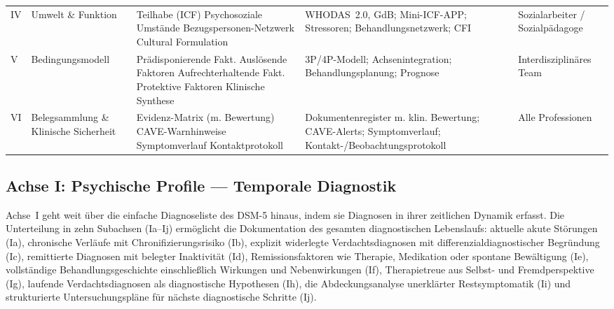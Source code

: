 \documentclass[11pt,a4paper]{article}
\begin{document}
\begin{longtable}{p{0.8cm}p{2.2cm}p{3.8cm}p{4cm}p{2cm}}
\addlinespace
IV & Umwelt \& Funktion & Teilhabe (ICF) \newline Psychosoziale Umst\"ande \newline Bezugspersonen-Netzwerk \newline Cultural Formulation & WHODAS~2.0, GdB; Mini-ICF-APP; Stressoren; Behandlungsnetzwerk; CFI & Sozialarbeiter / Sozialp\"adagoge \\
\addlinespace
V & Bedingungsmodell & Pr\"adisponierende Fakt. \newline Ausl\"osende Faktoren \newline Aufrechterhaltende Fakt. \newline Protektive Faktoren \newline Klinische Synthese & 3P/4P-Modell; Achsen\-integration; Behandlungs\-planung; Prognose & Interdisziplin\"ares Team \\
\addlinespace
VI & Belegsammlung \& Klinische Sicherheit & Evidenz-Matrix (m. Bewertung) \newline CAVE-Warnhinweise \newline Symptomverlauf \newline Kontaktprotokoll & Dokumentenregister m. klin. Bewertung; CAVE-Alerts; Symptomverlauf; Kontakt-/Beobachtungs\-protokoll & Alle Professionen \\
\bottomrule
\end{longtable}

\subsection{Achse I: Psychische Profile --- Temporale Diagnostik}
\label{sec:achse1}

Achse~I geht weit \"uber die einfache Diagnoseliste des DSM-5 hinaus, indem sie Diagnosen in ihrer zeitlichen Dynamik erfasst. Die Unterteilung in zehn Subachsen (Ia--Ij) erm\"oglicht die Dokumentation des gesamten diagnostischen Lebenslaufs: aktuelle akute St\"orungen (Ia), chronische Verl\"aufe mit Chronifizierungsrisiko (Ib), explizit widerlegte Verdachtsdiagnosen mit differenzialdiagnostischer Begr\"undung (Ic), remittierte Diagnosen mit belegter Inaktivit\"at (Id), Remissionsfaktoren wie Therapie, Medikation oder spontane Bew\"altigung (Ie), vollst\"andige Behandlungsgeschichte einschlie\ss{}lich Wirkungen und Nebenwirkungen (If), Therapietreue aus Selbst- und Fremdperspektive (Ig), laufende Verdachtsdiagnosen als diagnostische Hypothesen (Ih), die Abdeckungsanalyse unerklärter Restsymptomatik (Ii) und strukturierte Untersuchungspl\"ane f\"ur n\"achste diagnostische Schritte (Ij).
\end{document}
